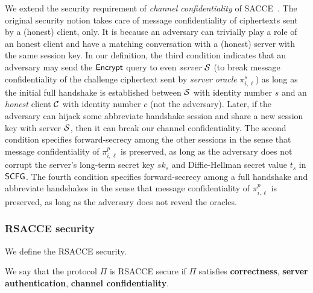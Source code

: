 \begin{remark}
We extend the security requirement of
\textit{channel confidentiality} of SACCE~\cite{KPW13:SACCE}.
The original security notion takes care of message
confidentiality of ciphertexts sent by a (honest)
client, only. It is because an adversary can trivially
play a role of an honest client and have a matching
conversation with a (honest) server with the same
session key. In our definition, the third condition
indicates that an adversary may send the $\mathsf{Encrypt}$
query to even \textit{server} $\mathcal{S}$ (to break
message confidentiality of the challenge ciphertext
sent by \textit{server oracle} $\pi^s_{i,\ell}$) as
long as the initial full handshake is established
between $\mathcal{S}$ with identity number $s$ and an \textit{honest} client
$\mathcal{C}$ with identity number $c$ (not the adversary). Later, if the
adversary can hijack some abbreviate handshake session
and share a new session key with server $\mathcal{S}$,
then it can break our channel confidentiality.
The second condition specifies forward-secrecy among
the other sessions in the
sense that message confidentiality of $\pi^p_{i,\ell}$
is preserved, as long as the adversary does not
corrupt the server's long-term secret key $sk_s$ and Diffie-Hellman
secret value $t_s$ in $\mathsf{SCFG}$.
The fourth condition specifies forward-secrecy among
a full handshake and abbreviate handshakes in the sense
that message confidentiality of $\pi^p_{i,\ell}$ is preserved,
as long as the adversary does not reveal the oracles.
\end{remark}

\subsubsection{RSACCE security}
We define the RSACCE security.

\begin{definition}
 We say that the protocol $\Pi$ is RSACCE secure
 if $\Pi$ satisfies \textbf{correctness},
 \textbf{server authentication},
 \textbf{channel confidentiality}.
\end{definition}